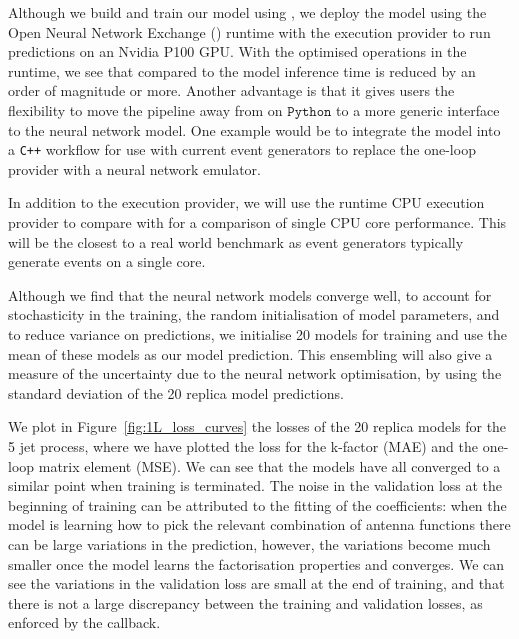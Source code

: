 \documentclass[main.tex]{subfiles}
\begin{document}
Although we build and train our model using {\TensorFlow},
we deploy the model using the Open Neural Network Exchange ({\ONNX})
runtime \cite{onnxruntime}
with the {\CUDA} execution provider to run predictions on an
Nvidia P100 GPU. With the optimised operations in the {\ONNX}
runtime, we see that compared to {\TensorFlow} the model inference
time is reduced by an order of magnitude or more. Another advantage
is that it gives users the flexibility to move the pipeline
away from {\TensorFlow} on $\mathtt{Python}$ to a more generic interface
to the neural network model. One example would be to integrate
the {\ONNX} model into a \texttt{C++} workflow for use with current event
generators to replace the one-loop provider with a neural
network emulator.

In addition to the {\CUDA} execution provider, we will use
the {\ONNX} runtime CPU execution provider to compare with
{\MadGraph} for a comparison of single CPU core performance.
This will be the closest to a real world benchmark as event
generators typically generate events on a single core.

Although we find that the neural network models converge well,
to account for stochasticity in the training, the random
initialisation of model parameters, and to reduce
variance on predictions, we initialise 20 models for training
and use the mean of these models as our model prediction. This
ensembling will also give a measure of the uncertainty
due to the neural network optimisation, by using the standard
deviation of the 20 replica model predictions.

We plot in Figure~\ref{fig:1L_loss_curves} the losses of the 20 replica
models for the 5 jet process, where we have plotted the loss for the
k-factor (MAE) and the one-loop matrix element (MSE).
We can see that the models have all
converged to a similar point when training is terminated. The
noise in the validation loss at the beginning of training can be
attributed to the fitting of the coefficients: when the model is
learning how to pick the relevant combination of antenna functions
there can be large variations in the prediction, however, the
variations become much smaller once the model learns the
factorisation properties and converges. We can
see the variations in the validation loss are small
at the end of training, and that there is not a large discrepancy
between the training and validation losses, as enforced by the
{\RatioEarlyStopping} callback.
\end{document}
